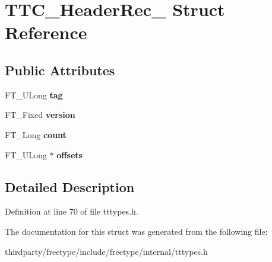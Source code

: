 \hypertarget{struct_t_t_c___header_rec__}{}\section{T\+T\+C\+\_\+\+Header\+Rec\+\_\+ Struct Reference}
\label{struct_t_t_c___header_rec__}
\subsection*{Public Attributes}
\begin{DoxyCompactItemize}
\item 
\mbox{\label{struct_t_t_c___header_rec___a7fc09906e402f8937b6ca207c84453b4}} 
F\+T\+\_\+\+U\+Long {\bfseries tag}
\item 
\mbox{\label{struct_t_t_c___header_rec___aa9ecb33279c68c3c00c1232441da5801}} 
F\+T\+\_\+\+Fixed {\bfseries version}
\item 
\mbox{\label{struct_t_t_c___header_rec___a0bf5898e9d8c55bc74f51712a5ad1b58}} 
F\+T\+\_\+\+Long {\bfseries count}
\item 
\mbox{\label{struct_t_t_c___header_rec___a2ab33f787e8085d7086968fb931060b5}} 
F\+T\+\_\+\+U\+Long $\ast$ {\bfseries offsets}
\end{DoxyCompactItemize}


\subsection{Detailed Description}


Definition at line 70 of file tttypes.\+h.



The documentation for this struct was generated from the following file\+:\begin{DoxyCompactItemize}
\item 
thirdparty/freetype/include/freetype/internal/tttypes.\+h\end{DoxyCompactItemize}
